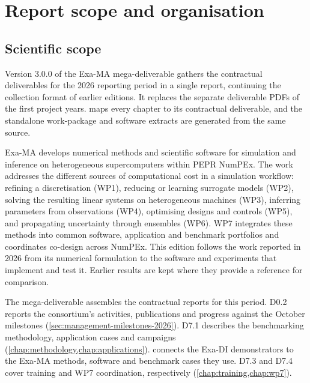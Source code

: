 
\section{Report scope and organisation}
\label{sec:introduction}

\subsection{Scientific scope}
\label{sec:purpose}

Version 3.0.0 of the Exa-MA mega-deliverable gathers the contractual
deliverables for the 2026 reporting period in a single report, continuing
the collection format of earlier editions. It replaces the separate
deliverable PDFs of the first project years.
 maps every chapter to its
contractual deliverable, and the standalone work-package and software
extracts are generated from the same source.

Exa-MA develops numerical methods and scientific software for
simulation and inference on heterogeneous supercomputers within
PEPR NumPEx. The work addresses the different sources of
computational cost in a simulation workflow: refining a discretisation
(WP1), reducing or learning surrogate models (WP2), solving the
resulting linear systems on heterogeneous machines (WP3), inferring
parameters from observations (WP4), optimising designs and controls
(WP5), and propagating uncertainty through ensembles (WP6). WP7
integrates these methods into common software, application and
benchmark portfolios and coordinates co-design across NumPEx.
This edition follows the work reported in 2026 from its numerical
formulation to the software and experiments that implement and test it.
Earlier results are kept where they provide a reference for comparison.

The mega-deliverable assembles the contractual reports for this period.
D0.2 reports the consortium's activities, publications and progress
against the October milestones (\cref{sec:management-milestones-2026}).
D7.1 describes the benchmarking methodology, application cases and
campaigns (\cref{chap:methodology,chap:applications}).
 connects the Exa-DI demonstrators to the
Exa-MA methods, software and benchmark cases they use.
D7.3 and D7.4 cover training and WP7 coordination, respectively
(\cref{chap:training,chap:wp7}).

